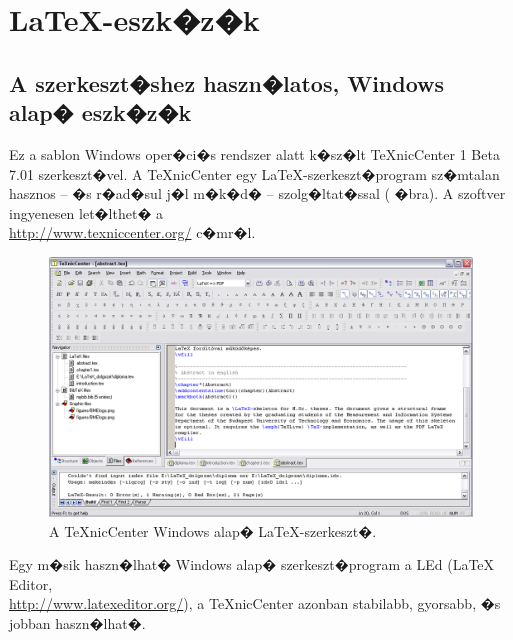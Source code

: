 \chapter{\LaTeX-eszk�z�k}\label{sect:LatexTools}
\section{A szerkeszt�shez haszn�latos, Windows alap� eszk�z�k}
Ez a sablon Windows oper�ci�s rendszer alatt k�sz�lt TeXnicCenter 1 Beta 7.01 szerkeszt�vel. A TeXnicCenter egy \LaTeX-szerkeszt�program sz�mtalan hasznos -- �s r�ad�sul j�l m�k�d� -- szolg�ltat�ssal ( �bra). A szoftver ingyenesen let�lthet� a\\\url{http://www.texniccenter.org/} c�mr�l.

\begin{figure}[!ht]
\centering
\includegraphics[width=150mm, keepaspectratio]{figures/TeXnicCenter.png}
\caption{A TeXnicCenter Windows alap� \LaTeX-szerkeszt�.} 
\label{fig:TexnicCenter}
\end{figure}
Egy m�sik haszn�lhat� Windows alap� szerkeszt�program a LEd (LaTeX Editor,\\\url{http://www.latexeditor.org/}), a TeXnicCenter azonban stabilabb, gyorsabb, �s jobban haszn�lhat�.

